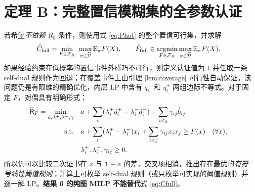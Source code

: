 \documentclass[11pt,a4paper]{ctexart}
\theoremstyle{definition}
\newcommand{\calP}{\mathcal P}
\newcommand{\calF}{\mathcal F}
\newcommand{\Ee}{\mathbb E}
\newcommand{\one}{\mathbf 1}
\newcommand{\hC}{\widehat C}
\begin{document}
\section{定理 B：完整置信模糊集的全参数认证}
若希望\emph{不依赖} $R_0$ 条件，则使用式 \eqref{eq:Phat} 的整个置信可行集，并求解
\begin{equation}\label{eq:Cfull}
\hC_{\rm full}=\min_{F\in\calF_K}\ \max_{\pi\in\widehat{\calP}}\Ee_\pi F(X),
\qquad \hat F_{\rm full}\in\operatorname*{argmin}_{F\in\calF_K}\max_{\pi\in\widehat{\calP}}\Ee_\pi F(X).
\end{equation}
如果经验约束在低概率的置信事件外碰巧不可行，则定义认证值为 $1$ 并任取一条 self-dual 规则作为回退；在覆盖事件上由引理 \ref{lem:coverage} 可行性自动保证。该问题仍是有限维的精确优化，内层 LP 中含有 $q_i^-$ 和 $q_i^+$ 两组边际不等式。对于固定 $F$，对偶具有明确形式：
\begin{align}\label{eq:intervaldual}
\widehat{\mathsf R}_F=\min_{a,\lambda^+,\lambda^-,\gamma}\quad& a+\sum_i(\lambda_i^+\hat q_i^+-\lambda_i^-\hat q_i^-)+\sum_{i<j}\gamma_{ij}\hat b_{ij}\\
\text{s.t.}\quad& a+\sum_i(\lambda_i^+-\lambda_i^-)x_i+\sum_{i<j}\gamma_{ij}x_ix_j\ge F(x)\quad(\forall x),\notag\\
&\lambda_i^+,\lambda_i^-,\gamma_{ij}\ge0.\notag
\end{align}
所以仍可以比较二次证书在 $x$ 与 $\one-x$ 的差，交叉项相消，推出存在最优的\emph{有符号线性阈值规则}；计算上可枚举 self-dual 规则（或只枚举可实现的阈值规则）并逐一解 LP。\textbf{结果 6 的纯图 MILP 不能替代}式 \eqref{eq:Cfull}。
\end{document}
